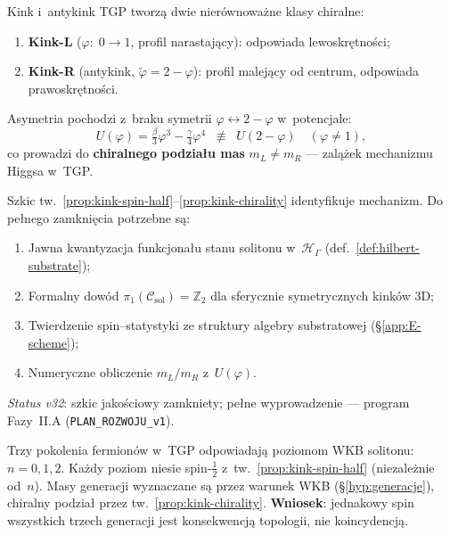 \begin{proposition}%
\label{prop:kink-chirality}
Kink i~antykink TGP tworz\k{a} dwie nierównoważne klasy
chiralne:
\begin{enumerate}[(C1)]
  \item \textbf{Kink-L} ($\varphi{:}\;0\!\to\!1$, profil narastaj\k{a}cy):
    odpowiada lewoskr\k{e}tno\'sci;
  \item \textbf{Kink-R} (antykink, $\tilde\varphi = 2-\varphi$):
    profil malej\k{a}cy od centrum,
    odpowiada prawoskr\k{e}tno\'sci.
\end{enumerate}
Asymetria pochodzi z~braku symetrii $\varphi \leftrightarrow 2-\varphi$
w~potencjale:
\begin{equation}\label{eq:chirality-asymmetry}
  U(\varphi) = \tfrac{\beta}{3}\varphi^3 - \tfrac{\gamma}{4}\varphi^4
  \;\;\not\equiv\;\;
  U(2-\varphi)
  \quad (\varphi \neq 1),
\end{equation}
co prowadzi do \textbf{chiralnego podzia\l{}u mas}
$m_L \neq m_R$ --- zal\k{a}\.zek mechanizmu Higgsa w~TGP.
\end{proposition}

\begin{problem}%
\label{prob:fermion-full}
Szkic tw.~\ref{prop:kink-spin-half}--\ref{prop:kink-chirality}
identyfikuje mechanizm.
Do pe\l{}nego zamkni\k{e}cia potrzebne s\k{a}:
\begin{enumerate}[nosep]
  \item Jawna kwantyzacja funkcjona\l{}u stanu solitonu
    w~$\mathcal{H}_\Gamma$ (def.~\ref{def:hilbert-substrate});
  \item Formalny dow\'od $\pi_1(\mathcal{C}_{\mathrm{sol}}) = \mathbb{Z}_2$
    dla sferycznie symetrycznych kink\'ow 3D;
  \item Twierdzenie spin--statystyki ze struktury
    algebry substratowej (\S\ref{app:E-scheme});
  \item Numeryczne obliczenie $m_L/m_R$ z~$U(\varphi)$.
\end{enumerate}
\textit{Status v32}: szkic jako\'sciowy zamkniety;
pe\l{}ne wyprowadzenie --- program Fazy~II.A
(\texttt{PLAN\_ROZWOJU\_v1}).
\end{problem}

\begin{remark}%
\label{rem:generations-wkb}
Trzy pokolenia fermion\'ow w~TGP odpowiadaj\k{a}
poziomom WKB solitonu: $n = 0, 1, 2$.
Ka\.zdy poziom niesie spin-$\tfrac{1}{2}$
z~tw.~\ref{prop:kink-spin-half} (niezale\.znie od~$n$).
Masy generacji wyznaczane s\k{a} przez warunek WKB
(\S\ref{hyp:generacje}), chiralny podzia\l{}
przez tw.~\ref{prop:kink-chirality}.
\textbf{Wniosek}: jednakowy spin wszystkich trzech generacji
jest konsekwencj\k{a} topologii, nie koincydencj\k{a}.
\end{remark}
